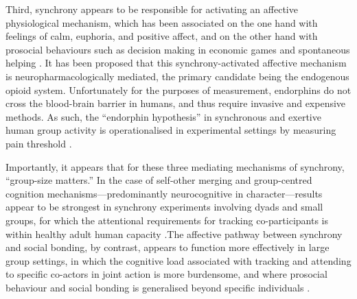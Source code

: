 Third, synchrony appears to be responsible for activating an affective physiological mechanism, which has been associated on the one hand with feelings of calm, euphoria, and positive affect, and on the other hand with prosocial behaviours such as decision making in economic games and spontaneous helping \citep{Wiltermuth2009,Reddish2013a,Mogan2017}.
It has been proposed that this synchrony-activated affective mechanism is neuropharmacologically mediated, the primary candidate being the endogenous opioid system.  Unfortunately for the purposes of measurement, endorphins do not cross the blood-brain barrier in humans, and thus require invasive and expensive methods.  As such, the ``endorphin hypothesis'' in synchronous and exertive human group activity is operationalised in experimental settings by measuring pain threshold \citep{Dunbar2008,Sullivan2013,Sullivan2014,Tarr2015}.

Importantly, it appears that for these three mediating mechanisms of synchrony, ``group-size matters.'' In the case of self-other merging and group-centred cognition mechanisms---predominantly neurocognitive in character---results appear to be strongest in synchrony experiments involving dyads and small groups, for which the attentional requirements for tracking co-participants is within healthy adult human capacity \citep{Mogan2017}.The affective pathway between synchrony and social bonding, by contrast, appears to function more effectively in large group settings, in which the cognitive load associated with tracking and attending to specific co-actors in joint action is more burdensome, and where prosocial behaviour and social bonding is generalised beyond specific individuals \citep{Reddish2013b, Reddish2016}.

